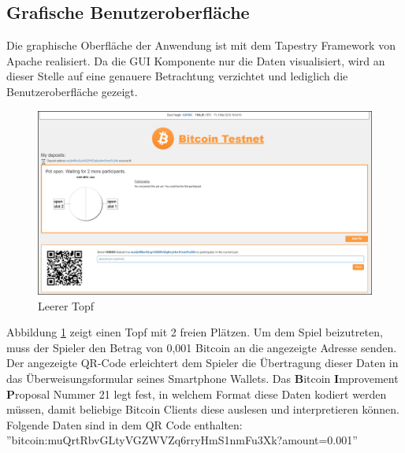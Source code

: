 \subsection{Grafische Benutzeroberfläche}\label{ssec:btc_gui}

Die graphische Oberfläche der Anwendung ist mit dem Tapestry Framework von Apache realisiert. Da die GUI Komponente nur die Daten visualisiert, wird an dieser Stelle auf eine genauere Betrachtung verzichtet und lediglich die Benutzeroberfläche gezeigt.


\begin{figure}[H]
\centering
\includegraphics[width=1\linewidth]{Figures/btc_gui/pot_open_empty}
\decoRule
\caption{Leerer Topf}
\label{fig:pot_open_empty}
\end{figure}
Abbildung \ref{fig:pot_open_empty} zeigt einen Topf mit 2 freien Plätzen. Um dem Spiel beizutreten, muss der Spieler den Betrag von 0,001 Bitcoin an die angezeigte Adresse senden. Der angezeigte QR-Code erleichtert dem Spieler die Übertragung dieser Daten in das Überweisungsformular seines Smartphone Wallets. Das \textbf{B}itcoin \textbf{I}mprovement \textbf{P}roposal Nummer 21 \cite{bip21} legt fest, in welchem Format diese Daten kodiert werden müssen, damit beliebige Bitcoin Clients diese auslesen und interpretieren können. 
Folgende Daten sind in dem QR Code enthalten:\\ ''bitcoin:muQrtRbvGLtyVGZWVZq6rryHmS1nmFu3Xk?amount=0.001''

